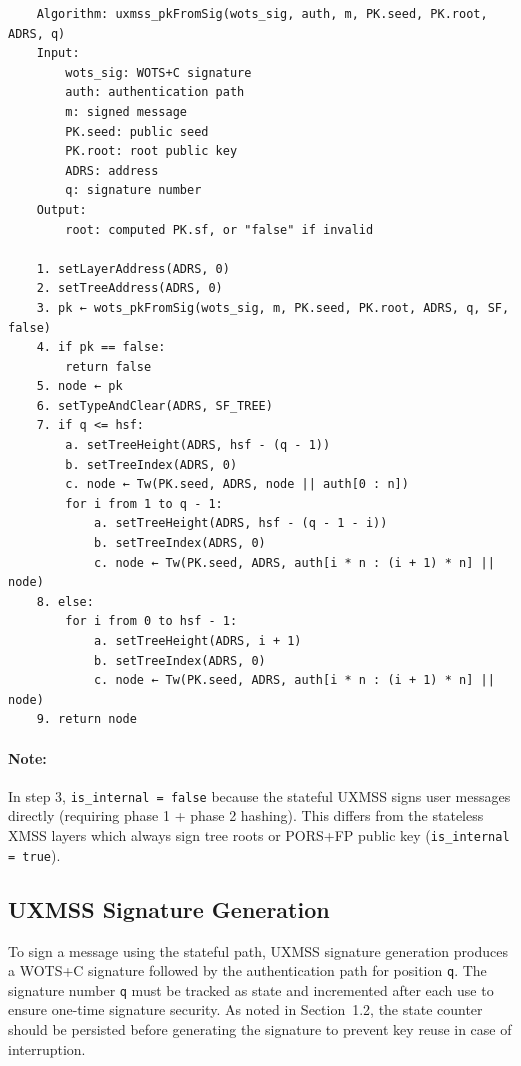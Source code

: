 \begin{verbatim}
    Algorithm: uxmss_pkFromSig(wots_sig, auth, m, PK.seed, PK.root, ADRS, q)
    Input:
        wots_sig: WOTS+C signature
        auth: authentication path 
        m: signed message
        PK.seed: public seed
        PK.root: root public key
        ADRS: address
        q: signature number
    Output:
        root: computed PK.sf, or "false" if invalid

    1. setLayerAddress(ADRS, 0)
    2. setTreeAddress(ADRS, 0)
    3. pk ← wots_pkFromSig(wots_sig, m, PK.seed, PK.root, ADRS, q, SF, false)
    4. if pk == false:
        return false
    5. node ← pk
    6. setTypeAndClear(ADRS, SF_TREE)
    7. if q <= hsf:
        a. setTreeHeight(ADRS, hsf - (q - 1))
        b. setTreeIndex(ADRS, 0)
        c. node ← Tw(PK.seed, ADRS, node || auth[0 : n])
        for i from 1 to q - 1:
            a. setTreeHeight(ADRS, hsf - (q - 1 - i))
            b. setTreeIndex(ADRS, 0)
            c. node ← Tw(PK.seed, ADRS, auth[i * n : (i + 1) * n] || node)
    8. else:  
        for i from 0 to hsf - 1:
            a. setTreeHeight(ADRS, i + 1)
            b. setTreeIndex(ADRS, 0)
            c. node ← Tw(PK.seed, ADRS, auth[i * n : (i + 1) * n] || node)
    9. return node
\end{verbatim}

\paragraph{Note:} In step 3, \texttt{is\_internal = false} because the stateful UXMSS signs user messages directly (requiring phase 1 + phase 2 hashing). This differs from the stateless XMSS layers which always sign tree roots or PORS+FP public key (\texttt{is\_internal = true}).

\subsection{UXMSS Signature Generation}
To sign a message using the stateful path, UXMSS signature generation produces a WOTS+C signature followed by the authentication path for position \texttt{q}. The signature number \texttt{q} must be tracked as state and incremented after each use to ensure one-time signature security. As noted in Section~1.2, the state counter should be persisted before generating the signature to prevent key reuse in case of interruption.

